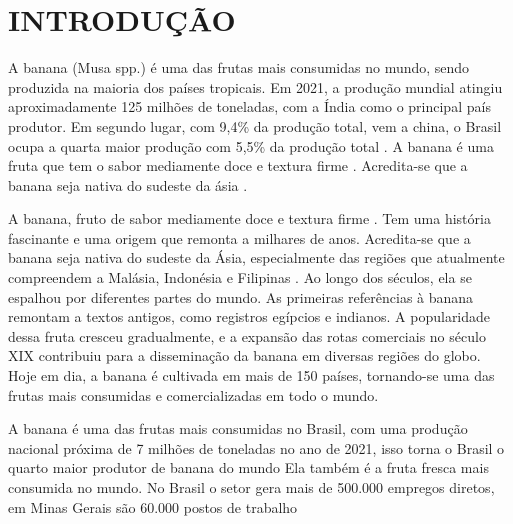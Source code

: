 \chapter{INTRODUÇÃO}

 A banana (Musa spp.) é uma das frutas mais consumidas no mundo, sendo produzida na maioria dos países tropicais. Em 2021, a produção mundial atingiu aproximadamente 125 milhões de toneladas, com a Índia como o principal país produtor. Em segundo lugar, com 9,4\% da produção total, vem a china, o Brasil ocupa a quarta maior produção com 5,5\% da produção total \cite{banana}. A banana é uma fruta que tem o sabor mediamente doce e textura firme \cite{MATSUURA2004}. Acredita-se que a banana seja nativa do sudeste da ásia \cite{1956TaOo}.

A banana, fruto de sabor mediamente doce e textura firme \cite{MATSUURA2004}. Tem uma história fascinante e uma origem que remonta a milhares de anos. Acredita-se que a banana seja nativa do sudeste da Ásia, especialmente das regiões que atualmente compreendem a Malásia, Indonésia e Filipinas \cite{1956TaOo}. Ao longo dos séculos, ela se espalhou por diferentes partes do mundo. As primeiras referências à banana remontam a textos antigos, como registros egípcios e indianos. A popularidade dessa fruta cresceu gradualmente, e a expansão das rotas comerciais no século XIX contribuiu para a disseminação da banana em diversas regiões do globo. Hoje em dia, a banana é cultivada em mais de 150 países, tornando-se uma das frutas mais consumidas e comercializadas em todo o mundo.

A banana é uma das frutas mais consumidas no Brasil, com uma produção nacional próxima de 7 milhões de toneladas no ano de 2021, isso torna o Brasil o quarto maior produtor de banana do mundo \cite{banana} Ela também é a fruta fresca mais consumida no mundo. No Brasil o setor gera mais de 500.000 empregos diretos, em Minas Gerais são 60.000 postos de trabalho